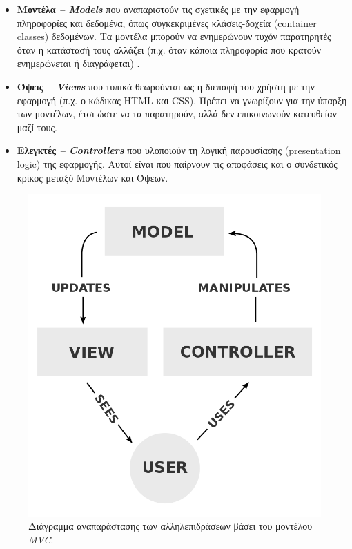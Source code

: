 \begin{itemize}
\item \textbf{Μοντέλα \textit{\textbf{--}} \textit{Models}} που αναπαριστούν τις σχετικές με την εφαρμογή πληροφορίες
και δεδομένα, όπως συγκεκριμένες κλάσεις-δοχεία (container classes) δεδομένων. Τα μοντέλα μπορούν να ενημερώνουν τυχόν παρατηρητές όταν η κατάστασή τους αλλάζει (π.χ. όταν κάποια πληροφορία που κρατούν ενημερώνεται ή διαγράφεται) \cite{[MVC1]}.
\item \textbf{Όψεις \textit{\textbf{--}} \textit{Views}} που τυπικά θεωρούνται ως η διεπαφή του χρήστη με την εφαρμογή
(π.χ. ο κώδικας HTML και CSS). Πρέπει να γνωρίζουν για την ύπαρξη των
μοντέλων, έτσι ώστε να τα παρατηρούν, αλλά δεν επικοινωνούν κατευθείαν μαζί
τους.
\item \textbf{Ελεγκτές \textit{\textbf{--}} \textit{Controllers}} που υλοποιούν τη λογική παρουσίασης (presentation logic)
της εφαρμογής. Αυτοί είναι που παίρνουν τις αποφάσεις και ο συνδετικός κρίκος μεταξύ Μοντέλων και Όψεων.
\end{itemize}

\begin{figure}[ht]
	\includegraphics[scale=0.2]{figures/mvc-model.png}
	\centering
	\caption{Διάγραμμα αναπαράστασης των αλληλεπιδράσεων βάσει του μοντέλου \textit{MVC}.}
	\label{mvcmodel}
\end{figure}


